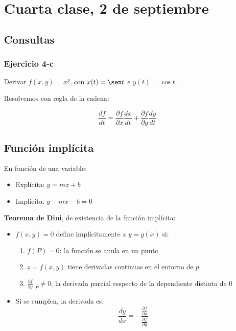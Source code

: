 \section{Cuarta clase, 2 de septiembre}

\subsection{Consultas}

\subsubsection{Ejercicio 4-c}

Derivar $f(x,y) = x^{y}$, con $x(t)=\sen t$ e $y(t) = \cos t$.

Resolvemos con regla de la cadena:

$$\frac{df}{dt} = \frac{\partial f}{\partial x}\frac{dx}{dt} + \frac{\partial f}{\partial y}\frac{dy}{dt}$$

\subsection{Función implícita}

En función de una variable:
\begin{itemize}
    \item Explícita: $y = mx + b$
    \item Implícita: $y - mx - b = 0$
\end{itemize}

\textbf{Teorema de Dini}, de existencia de la función implícita:
\begin{itemize}
    \item $f(x,y) = 0$ define implícitamente a $y = g(x)$ si:
          \begin{enumerate}
              \item $f(P) = 0$: la función se anula en un punto
              \item $z=f(x,y)$ tiene derivadas continuas en el entorno de $p$
              \item $\frac{\partial f}{\partial y}|_P \neq 0$, la derivada parcial
                    respecto de la dependiente distinta de 0
          \end{enumerate}
    \item Si se cumplen, la derivada es:
          $$\frac{dy}{dx} = -\frac{\frac{\partial f}{\partial x}}{\frac{\partial f}{\partial y}}$$
\end{itemize}

